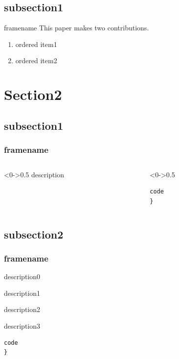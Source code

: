 \documentclass[9pt,aspectratio=43,mathserif,table]{beamer}
\begin{document}
\subsection{subsection1}
\begin{frame}{framename}
  This paper makes two contributions.
  \begin{enumerate}
    \item<0-> ordered item1
    \item<0-> ordered item2
  \end{enumerate}
\end{frame}

\section{Section2}
\subsection{subsection1}
\begin{frame}[fragile]
  \frametitle{framename}
  \begin{columns}[T]
    \begin{column}<0->{0.5\textwidth}
      description
    \end{column}
    \hfill
    \begin{column}<0->{0.5\textwidth}
      \begin{lstlisting}
code
}
    \end{lstlisting}
    \end{column}
  \end{columns}
\end{frame}

\subsection{subsection2}
\begin{frame}[fragile]
  \frametitle{framename}
  description0
  \begin{itemize}
     {\item description1}
           {\item description2}
           {\item description3}
  \end{itemize}
  
  \begin{lstlisting}[firstnumber=3]
code
}
  \end{lstlisting}
\end{frame}
\end{document}
